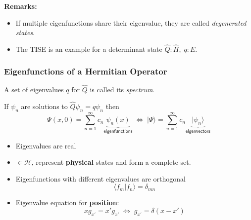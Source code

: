 \textbf{Remarks:}
\begin{itemize}
    \item If multiple eigenfunctions share their eigenvalue, they are called \textit{degenerated states}.
    \item The TISE is an example for a determinant state\newline
          $\hat{Q}: \hat{H},\; q:E$.
\end{itemize}

\subsubsection{Eigenfunctions of a Hermitian Operator}\label{midterm:eig_fun}
A set of eigenvalues $q$ for $\hat{Q}$ is called its \textit{spectrum}.

\newpar{}

If $\psi_n$ are solutions to $\hat{Q}\psi_n=q\psi_n$ then
\noindent\begin{equation*}
    \Psi(x,0)     = \sum_{n=1}^{\infty} c_n \underbrace{\psi_n(x)}_{\textsf{eigenfunctions}} \;\Leftrightarrow\; |\Psi\rangle  = \sum_{n=1}^{\infty} c_n \underbrace{|\psi_n\rangle}_{\textsf{eigenvectors}}
\end{equation*}

\begin{itemize}
    \item Eigenvalues are real
    \item $\in \mathcal{H}$, represent \textbf{physical} states and form a complete set.
    \item Eigenfunctions with different eigenvalues are orthogonal
          \noindent\begin{equation*}
              \langle f_m|f_n\rangle=\delta_{mn}
          \end{equation*}
    \item Eigenvalue equation for \textbf{position}:
          \noindent\begin{equation*}
              \widehat{x}g_{x'}= x'g_{x'}\;\Leftrightarrow\; g_{x'}=\delta(x-x')
          \end{equation*}
\end{itemize}

